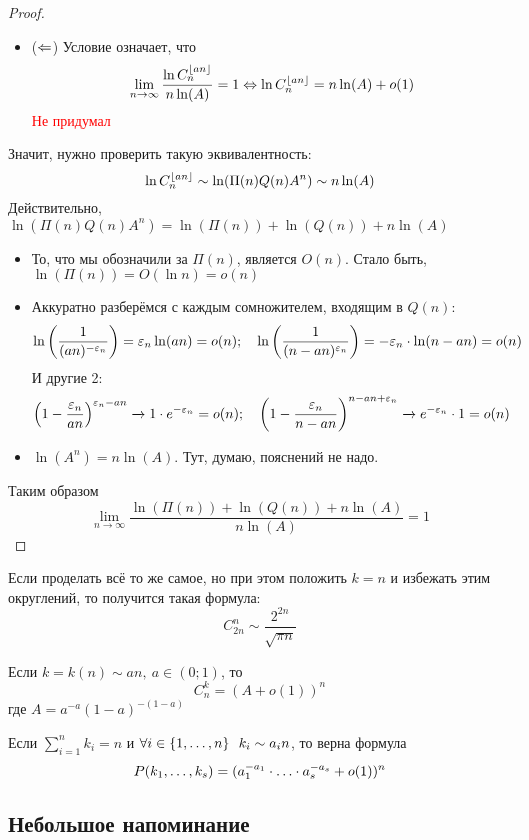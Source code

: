 \begin{proof}
\begin{itemize}
		\item ($\Leftarrow$) Условие означает, что
		\[
			\lim_{n \to \infty} \frac{\ln C_n^{\left\lfloor an \right\rfloor}}{n\ln(A)} = 1 \Leftrightarrow \ln C_n^{\left\lfloor an \right\rfloor} = n\ln(A) + o(1)
		\]
		\textcolor{red}{Не придумал}
	\end{itemize}
	Значит, нужно проверить такую эквивалентность:
	\[
		\ln C_n^{\left\lfloor an \right\rfloor} \sim \ln(\Pi(n)Q(n)A^n) \sim n\ln(A)	
	\]
	Действительно, $\ln(\Pi(n)Q(n)A^n) = \ln(\Pi(n)) + \ln(Q(n)) + n\ln(A)$
	\begin{itemize}
		\item То, что мы обозначили за $\Pi(n)$, является $O(n)$. Стало быть, $\ln(\Pi(n)) = O(\ln n) = o(n)$
		
		\item Аккуратно разберёмся с каждым сомножителем, входящим в $Q(n)$:
		\[
			\ln\left(\frac{1}{(an)^{-\varepsilon_n}}\right) = \varepsilon_n \ln(an) = o(n); \quad \ln\left(\frac{1}{(n - an)^{\varepsilon_n}}\right) = -\varepsilon_n \cdot \ln(n - an) = o(n)
		\]
		И другие 2:
		\[
			\left(1 - \frac{\varepsilon_n}{an}\right)^{\varepsilon_n - an} \xrightarrow{} 1 \cdot e^{-\varepsilon_n} = o(n); \quad \left(1 - \frac{\varepsilon_n}{n - an}\right)^{n - an + \varepsilon_n} \xrightarrow{} e^{-\varepsilon_n} \cdot 1 = o(n)
		\]
		
		\item $\ln(A^n) = n\ln(A)$. Тут, думаю, пояснений не надо.
	\end{itemize}
	Таким образом
	\[
		\lim_{n \to \infty} \frac{\ln(\Pi(n)) + \ln(Q(n)) + n\ln(A)}{n\ln(A)} = 1
	\]
\end{proof}

\begin{corollary}
	Если проделать всё то же самое, но при этом положить $k = n$ и избежать этим округлений, то получится такая формула:
	\[
		C_{2n}^n \sim \frac{2^{2n}}{\sqrt{\pi n}}
	\]
\end{corollary}

\begin{exercise}
	Если $k = k(n) \sim an,\ a \in (0; 1)$, то
	\[
		C_n^k = (A + o(1))^n
	\]
	где $A = a^{-a}(1 - a)^{-(1 - a)}$
\end{exercise}

\begin{exercise}
	Если $\sum_{i = 1}^n k_i = n$ и $\forall i \in \{1, \ldots, n\}\ \ k_i \sim a_in$, то верна формула
	\[
		P(k_1, \ldots, k_s) = (a_1^{-a_1} \cdot \ldots \cdot a_s^{-a_s} + o(1))^n
	\]
\end{exercise}

\subsection{Небольшое напоминание}

